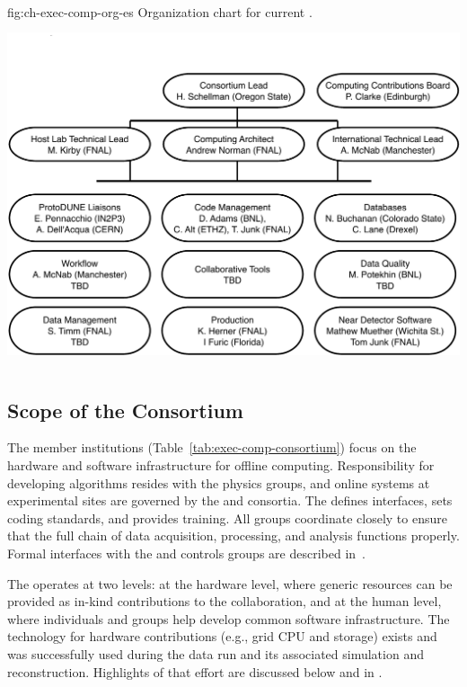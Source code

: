 \begin{dunefigure}
{fig:ch-exec-comp-org-es}
{Organization chart for current .}
\includegraphics[height=4in]{graphics/comp-org-chart.pdf}
\end{dunefigure}

\subsection{Scope of the Consortium}
\label{ch:exec-comp-gov-scope}

The  member institutions (Table~\ref{tab:exec-comp-consortium}) focus on the hardware and software infrastructure for offline computing.  Responsibility for developing algorithms resides %
with the physics groups, %
and online systems at experimental sites are governed by the  and  consortia. 
The  defines interfaces, sets coding standards, and provides training. %
All groups coordinate closely to ensure that the full chain of data acquisition, processing, and analysis %
functions properly. Formal interfaces with the  and controls groups are described in~\cite{bib:docdb7123,bib:docdb7126}. %

The  operates at two levels: at the hardware level, where generic resources can be provided as in-kind contributions to the collaboration, and at the human level, where individuals and groups help develop common software infrastructure.  The technology for hardware contributions (e.g., grid CPU and storage) exists and was successfully used during the  data run and its associated %
simulation and reconstruction. Highlights of that effort are discussed below and in \physchtools{}. %

